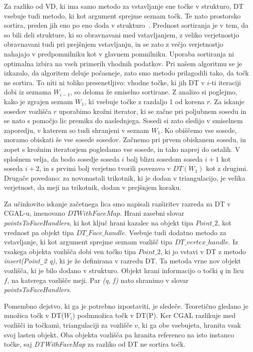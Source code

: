 \documentclass[a4paper, 12pt]{book}
\newcommand{\U}{\texttt{\_}}
\begin{document}
Za razliko od VD, ki ima samo metodo za vstavljanje ene točke v strukturo, DT vsebuje tudi metodo, ki kot argument sprejme seznam točk. Te nato prostorsko sortira, preden jih eno po eno doda v strukturo~\cite{cgal:dd-ss-15a}. Prednost sortiranja je v tem, da so bili deli strukture, ki so obravnavani med vstavljanjem, z veliko verjetnostjo obravnavani tudi pri prejšnjem vstavljanju, in se zato z večjo verjetnostjo nahajajo v predpomnilniku kot v glavnem pomnilniku. Uporaba sortiranja ni optimalna izbira na vseh primerih vhodnih podatkov. Pri našem algoritmu se je izkazalo, da algoritem deluje počasneje, zato smo metodo prilagodili tako, da točk ne sortira. To niti ni toliko presenetljivo: vhodne točke, ki jih DT v $i$-ti iteraciji dobi iz seznama $W_{i-1}$, so deloma že smiselno sortirane. Z analizo si poglejmo, kako je zgrajen seznam $W_1$, ki vsebuje točke z razdaljo 1 od korena $r$. Za iskanje sosedov vozlišča $r$  uporabimo krožni iterator, ki se začne pri poljubnem sosedu in se nato s pomočjo lic premika do naslednjega. Sosedi si zato sledijo v smiselnem zaporedju, v katerem so tudi shranjeni v seznam $W_1$. Ko obiščemo vse sosede, moramo obiskati še vse sosede sosedov. Začnemo pri prvem obiskanem sosedu, in zopet s krožnim iteratorjem pogledamo vse sosede, in tako naprej do ostalih. V splošnem velja, da bodo sosedje soseda $i$ bolj blizu sosedom soseda $i+1$ kot soseda $i+2$, in s prvimi bolj verjetno tvorili povezavo v $DT(W_1)$ kot z drugimi. Drugače povedano: za novonastali trikotnik, ki je dodan v triangulacijo, je velika verjetnost, da meji na trikotnik, dodan v prejšnjem koraku.

\bigbreak

Za učinkovito iskanje začetnega lica smo napisali razširitev razreda za DT v CGAL-u, imenovano $DTWithFaceMap$. Hrani zasebni slovar \textit{pointsToFaceHandlers}, ki kot ključ hrani kazalec na objekt tipa $Point\U 2$, kot vrednost pa objekt tipa $DT\U Face\U handle$. Vsebuje tudi dodatno metodo za vstavljanje, ki kot argument sprejme seznam vozlišč tipa $DT\U vertex\U handle$. Iz vsakega objekta vozlišča dobi ven točko tipa $Point\U 2$, ki jo vstavi v DT z metodo \textit{insert(Point\U 2 q)}, ki je že definirana  v razredu DT. Ta metoda vrne nov objekt vozlišča, ki je bilo dodano v strukturo. Objekt hrani informacijo o točki $q$ in licu $f$, na katerega vozlišče meji. Par \textit{(q, f)} nato shranimo v slovar \textit{pointsToFaceHandlers}.

Pomembno dejstvo, ki ga je potrebno izpostaviti, je sledeče. Teoretično gledano je množica točk v DT($W_i$) podmnožica točk v DT(P). Ker CGAL razlikuje med vozlišči in točkami, triangulaciji za vozlišče $v$, ki ga obe vsebujeta, hranita vsak svoj lasten objekt. Oba objekta vozlišča pa hranita referenco na isto instanco točke, saj \textit{DTWithFaceMap} za razliko od DT ne sortira točk.
\end{document}
